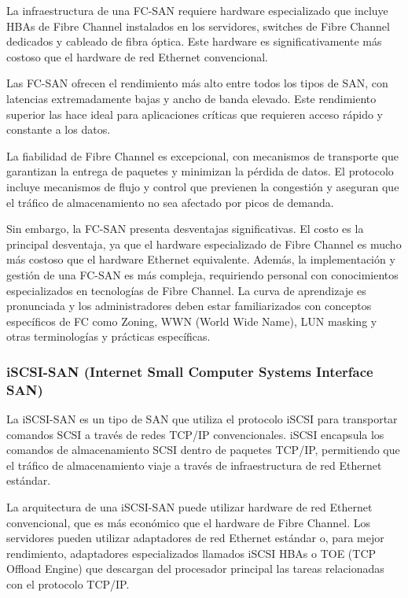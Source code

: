 La infraestructura de una FC-SAN requiere hardware especializado que incluye HBAs de Fibre Channel instalados en los servidores, switches de Fibre Channel dedicados y cableado de fibra óptica. Este hardware es significativamente más costoso que el hardware de red Ethernet convencional.

Las FC-SAN ofrecen el rendimiento más alto entre todos los tipos de SAN, con latencias extremadamente bajas y ancho de banda elevado. Este rendimiento superior las hace ideal para aplicaciones críticas que requieren acceso rápido y constante a los datos.

La fiabilidad de Fibre Channel es excepcional, con mecanismos de transporte que garantizan la entrega de paquetes y minimizan la pérdida de datos. El protocolo incluye mecanismos de flujo y control que previenen la congestión y aseguran que el tráfico de almacenamiento no sea afectado por picos de demanda.

Sin embargo, la FC-SAN presenta desventajas significativas. El costo es la principal desventaja, ya que el hardware especializado de Fibre Channel es mucho más costoso que el hardware Ethernet equivalente. Además, la implementación y gestión de una FC-SAN es más compleja, requiriendo personal con conocimientos especializados en tecnologías de Fibre Channel. La curva de aprendizaje es pronunciada y los administradores deben estar familiarizados con conceptos específicos de FC como Zoning, WWN (World Wide Name), LUN masking y otras terminologías y prácticas específicas.

\subsubsection{iSCSI-SAN (Internet Small Computer Systems Interface SAN)}

La iSCSI-SAN es un tipo de SAN que utiliza el protocolo iSCSI para transportar comandos SCSI a través de redes TCP/IP convencionales. iSCSI encapsula los comandos de almacenamiento SCSI dentro de paquetes TCP/IP, permitiendo que el tráfico de almacenamiento viaje a través de infraestructura de red Ethernet estándar. 

La arquitectura de una iSCSI-SAN puede utilizar hardware de red Ethernet convencional, que es más económico que el hardware de Fibre Channel. Los servidores pueden utilizar adaptadores de red Ethernet estándar o, para mejor rendimiento, adaptadores especializados llamados iSCSI HBAs o TOE (TCP Offload Engine) que descargan del procesador principal las tareas relacionadas con el protocolo TCP/IP.

